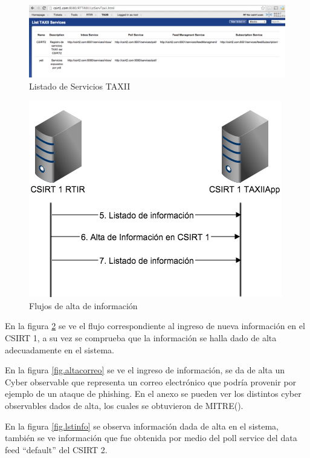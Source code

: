 \begin{figure}[H]
	\centering
	\includegraphics[scale=0.35]{caso-de-estudio/listadoservicios.png}
	\caption{Listado de Servicios TAXII}
	\label{fig.lstservicios}
\end{figure}


\begin{figure}[H]
	\centering
	\includegraphics[scale=0.7]{flujos/flujo5-7.png}
	\caption{Flujos de alta de información}
	\label{fig.flujos57}
\end{figure}

En la figura \ref{fig.flujos57} se ve el flujo correspondiente al ingreso de nueva información en el CSIRT 1, a su vez se comprueba que la información se halla dado de alta adecuadamente en el sistema. 

En la figura \ref{fig.altacorreo} se ve el ingreso de información, se da de alta un Cyber observable que representa un correo electrónico que podría provenir por ejemplo de un ataque de phishing. En el anexo se pueden ver los distintos cyber observables dados de alta, los cuales se obtuvieron de MITRE(\cite{mitre}).

En la figura \ref{fig.lstinfo} se observa información dada de alta en el sistema, también se ve información que fue obtenida por medio del poll service del data feed “default” del CSIRT 2.


